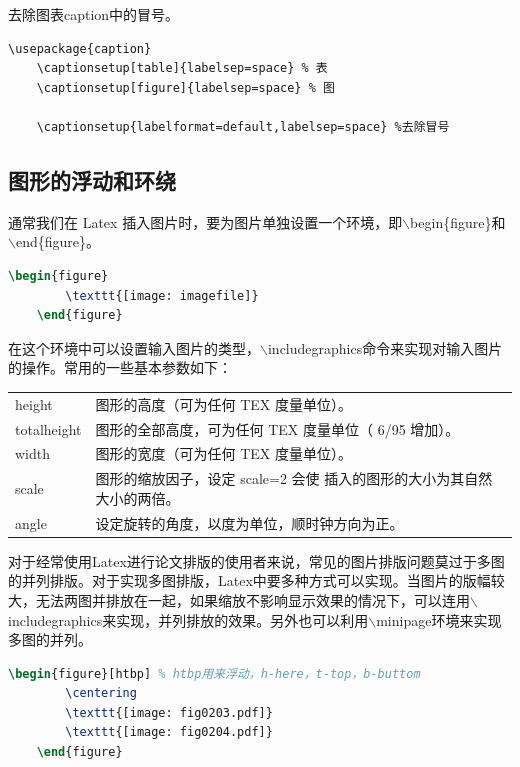 \documentclass[12pt]{book}
\begin{document}
去除图表caption中的冒号。
\begin{lstlisting}[breaklines]
	\usepackage{caption}
	\captionsetup[table]{labelsep=space} % 表
	\captionsetup[figure]{labelsep=space} % 图
	
	\captionsetup{labelformat=default,labelsep=space} %去除冒号
\end{lstlisting}
  


\subsection{图形的浮动和环绕}

通常我们在 Latex 插入图片时，要为图片单独设置一个环境，即$\backslash$begin\{figure\}和$\backslash$end\{figure\}。
\begin{lstlisting}[language=tex]
	\begin{figure}
		\texttt{[image: imagefile]}
	\end{figure}
\end{lstlisting}

在这个环境中可以设置输入图片的类型，$\backslash$includegraphics命令来实现对输入图片的操作。常用的一些基本参数如下：

\begin{table}[h]
	\centering
	\begin{tabular}{ll}
		height &	图形的高度（可为任何 TEX 度量单位）。\\
		totalheight	& 图形的全部高度，可为任何 TEX 度量单位（ 6/95 增加）。\\
		width &	图形的宽度（可为任何 TEX 度量单位）。\\
		scale	& 图形的缩放因子，设定 scale=2 会使 插入的图形的大小为其自然大小的两倍。\\
		angle &	设定旋转的角度，以度为单位，顺时钟方向为正。\\
	\end{tabular}
\end{table}

对于经常使用Latex进行论文排版的使用者来说，常见的图片排版问题莫过于多图的并列排版。对于实现多图排版，Latex中要多种方式可以实现。当图片的版幅较大，无法两图并排放在一起，如果缩放不影响显示效果的情况下，可以连用$\backslash$includegraphics来实现，并列排放的效果。另外也可以利用$\backslash$minipage环境来实现多图的并列。

\begin{lstlisting}[language=tex,breaklines]
	\begin{figure}[htbp] % htbp用来浮动，h-here，t-top，b-buttom
		\centering
		\texttt{[image: fig0203.pdf]}
		\texttt{[image: fig0204.pdf]}
	\end{figure}
\end{lstlisting}
\end{document}
